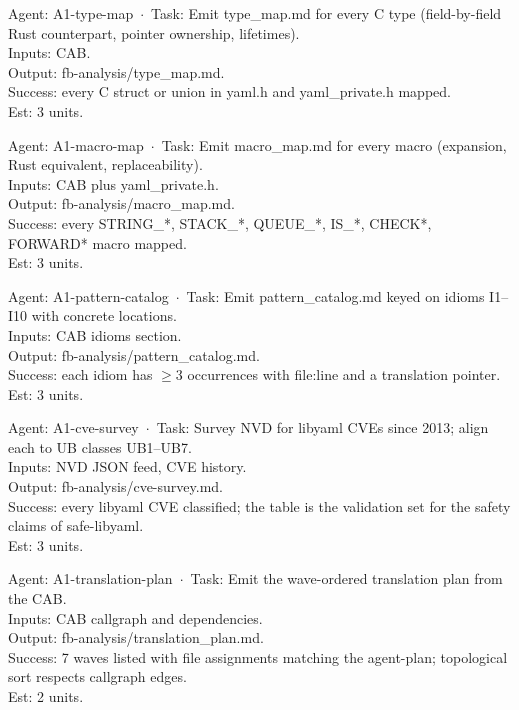\documentclass[12pt]{article}
\theoremstyle{definition}
\theoremstyle{remark}
\newenvironment{tasklist}{%
  \begingroup\raggedright
  \begin{description}[style=nextline, leftmargin=1.8cm, itemsep=0.4em]
}{%
  \end{description}
  \endgroup
}
\begin{document}
\begin{tasklist}
\item[T25.] {\ttfamily [~] Agent: A1-type-map~$\cdot$~Task: Emit type\_map.md for every C type (field-by-field Rust counterpart, pointer ownership, lifetimes).}\\
Inputs: CAB.\\
Output: fb-analysis/type\_map.md.\\
Success: every C struct or union in yaml.h and yaml\_private.h mapped.\\
Est: 3 units.

\item[T26.] {\ttfamily [~] Agent: A1-macro-map~$\cdot$~Task: Emit macro\_map.md for every macro (expansion, Rust equivalent, replaceability).}\\
Inputs: CAB plus yaml\_private.h.\\
Output: fb-analysis/macro\_map.md.\\
Success: every STRING\_*, STACK\_*, QUEUE\_*, IS\_*, CHECK*, FORWARD* macro mapped.\\
Est: 3 units.

\item[T27.] {\ttfamily [~] Agent: A1-pattern-catalog~$\cdot$~Task: Emit pattern\_catalog.md keyed on idioms I1--I10 with concrete locations.}\\
Inputs: CAB idioms section.\\
Output: fb-analysis/pattern\_catalog.md.\\
Success: each idiom has $\geq 3$ occurrences with file:line and a translation pointer.\\
Est: 3 units.

\item[T28.] {\ttfamily [~] Agent: A1-cve-survey~$\cdot$~Task: Survey NVD for libyaml CVEs since 2013; align each to UB classes UB1--UB7.}\\
Inputs: NVD JSON feed, CVE history.\\
Output: fb-analysis/cve-survey.md.\\
Success: every libyaml CVE classified; the table is the validation set for the safety claims of safe-libyaml.\\
Est: 3 units.

\item[T29.] {\ttfamily [~] Agent: A1-translation-plan~$\cdot$~Task: Emit the wave-ordered translation plan from the CAB.}\\
Inputs: CAB callgraph and dependencies.\\
Output: fb-analysis/translation\_plan.md.\\
Success: 7 waves listed with file assignments matching the agent-plan; topological sort respects callgraph edges.\\
Est: 2 units.

\end{tasklist}
\end{document}

